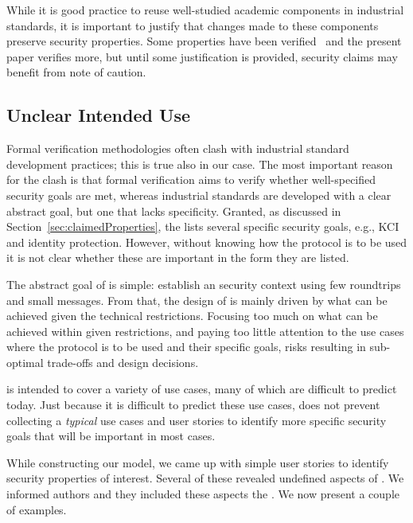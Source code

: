 \documentclass[runningheads, envcountsame, a4paper, draft, x11names]{llncs}
\begin{document}
While it is good practice to reuse well-studied academic components in
industrial standards, it is important to justify that changes made to these
components preserve security properties.
%
Some properties have been verified~\cite{DBLP:conf/secsr/BruniJPS18} and the
present paper verifies more, but until some justification is provided, security
claims may benefit from note of caution.

\subsection{Unclear Intended Use}
\label{sec:unclearProtocolUse}
Formal verification methodologies often clash with industrial standard
development practices; this is true also in our case.
%
The most important reason for the clash is that formal verification aims to
verify whether well-specified security goals are met, whereas industrial
standards are developed with a clear abstract goal,
but one that lacks specificity.
%
Granted, as discussed in Section~\ref{sec:claimedProperties}, the \mSpec{} lists
several specific security goals, e.g., KCI and identity protection.
%
However, without knowing how the protocol is to be used
it is not clear whether these are important in the form they are listed.
%

The abstract goal of \mEdhoc{} is simple: establish an \mOscore{} security
context using few roundtrips and small messages.
%
From that, the design of \mEdhoc{} is mainly driven by what
can be achieved given the technical restrictions.
%
Focusing too much on what can be achieved within given restrictions, and paying
too little attention to the use cases where the
protocol is to be used and their specific goals, risks resulting in
sub-optimal trade-offs and design decisions.
%

\mEdhoc{} is intended to cover a variety of use cases, many of which are
difficult to predict today.
%
Just because it is difficult to predict these use cases, does not
prevent collecting a \emph{typical} use cases and user stories
to identify more specific security goals that will be important in most cases.
%

While constructing our model, we came up with simple user stories to identify
security properties of interest.
%
Several of these revealed undefined aspects of \mEdhoc{}.
%
We informed \mEdhoc{} authors and they included these aspects the \mSpec{}.
%
We now present a couple of examples.\\
%
\end{document}
